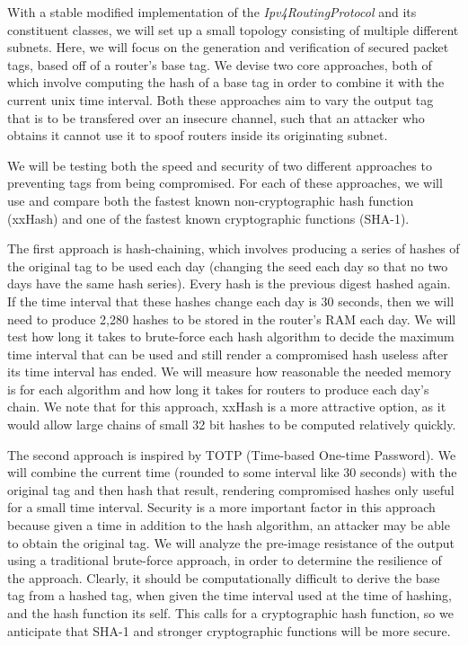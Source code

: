 \documentclass[12pt]{article} %
\begin{document}
With a stable modified implementation of the {\it Ipv4RoutingProtocol} and its constituent classes, we will set up a small topology consisting of multiple different subnets. Here, we will focus on the generation and verification of secured packet tags, based off of a router's base tag. We devise two core approaches, both of which involve computing the hash of a base tag in order to combine it with the current unix time interval. Both these approaches aim to vary the output tag that is to be transfered over an insecure channel, such that an attacker who obtains it cannot use it to spoof routers inside its originating subnet.

We will be testing both the speed and security of two different approaches to preventing tags from being compromised. For each of these approaches, we will use and compare both the fastest known non-cryptographic hash function (xxHash\cite{xxhash}) and one of the fastest known cryptographic functions (SHA-1). 

The first approach is hash-chaining, which involves producing a series of hashes of the original tag to be used each day (changing the seed each day so that no two days have the same hash series). Every hash is the previous digest hashed again. If the time interval that these hashes change each day is 30 seconds, then we will need to produce 2,280 hashes to be stored in the router's RAM each day. We will test how long it takes to brute-force each hash algorithm to decide the maximum time interval that can be used and still render a compromised hash useless after its time interval has ended. We will measure how reasonable the needed memory is for each algorithm and how long it takes for routers to produce each day's chain. We note that for this approach, xxHash is a more attractive option, as it would allow large chains of small 32 bit hashes to be computed relatively quickly.

The second approach is inspired by TOTP (Time-based One-time Password). We will combine the current time (rounded to some interval like 30 seconds) with the original tag and then hash that result, rendering compromised hashes only useful for a small time interval. Security is a more important factor in this approach because given a time in addition to the hash algorithm, an attacker may be able to obtain the original tag. We will analyze the pre-image resistance of the output using a traditional brute-force approach, in order to determine the resilience of the approach. Clearly, it should be computationally difficult to derive the base tag from a hashed tag, when given the time interval used at the time of hashing, and the hash function its self. This calls for a cryptographic hash function, so we anticipate that SHA-1 and stronger cryptographic functions will be more secure. 








\end{document}
